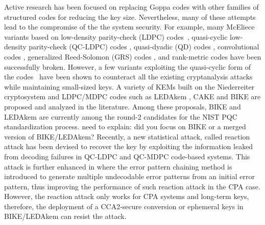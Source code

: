 \documentclass[runningheads]{llncs}
\begin{document}
Active research has been focused on replacing Goppa codes 
with other families of structured codes for reducing the key size. 
Nevertheless, many of these attempts lead to the compromise of the the system security. 
For example, many McEliece variants based on low-density parity-check (LDPC) codes~\cite{monico2000using}, 
quasi-cyclic low-density parity-check (QC-LDPC) codes \cite{otmani2010cryptanalysis}, 
quasi-dyadic (QD) codes \cite{misoczki2009compact}, 
convolutional codes \cite{londahl2012new}, generalized Reed-Solomon (GRS) codes \cite{baldi2016enhanced}, and rank-metric codes \cite{loidreau2017new,gaborit2018polynomial} 
have been successfully broken. 
However, a few variants exploiting the quasi-cyclic form of the codes~\cite{baldi2013optimization,baldi2008new,misoczki2013mdpc} have been shown to counteract  
all the existing cryptanalysis attacks while maintaining small-sized keys. 
A variety of KEMs built on the Niederreiter cryptosystem and LDPC/MDPC codes 
such as LEDAkem \cite{baldi2018ledakem}, CAKE \cite{barreto2017cake} and BIKE \cite{aragon2017bike} 
are proposed and analyzed in the literature. 
Among these proposals, BIKE and LEDAkem are currently 
among the round-2 candidates for the NIST PQC standardization process. 
{\color{red} need to explain: did you focus on BIKE or
a merged version of BIKE/LEDAkem?}
Recently, a new statistical attack, called reaction attack \cite{fabvsivc2017reaction,guo2016key} 
has been devised to recover the key by exploiting the information leaked from decoding failures in QC-LDPC and QC-MDPC code-based systems. 
This attack is further enhanced in \cite{nilsson2019error} where the error pattern chaining method 
is introduced to generate multiple undecodable error patterns from an initial error pattern, 
thus improving the performance of such reaction attack in the CPA case. 
However, the reaction attack only works for CPA systems and long-term keys, therefore, 
the deployment of a CCA2-secure conversion or ephemeral keys in BIKE/LEDAkem
can resist the attack.
\end{document}
